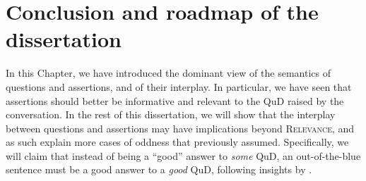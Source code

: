 %
%
%
%
%


\section{Conclusion and roadmap of the dissertation}

In this Chapter, we have introduced the dominant view of the semantics of questions and assertions, and of their interplay. In particular, we have seen that assertions should better be informative and relevant to the QuD raised by the conversation. In the rest of this dissertation, we will show that the interplay between questions and assertions may have implications beyond \textsc{Relevance}, and as such explain more cases of oddness that previously assumed. Specifically, we will claim that instead of being a ``good'' answer to \textit{some} QuD, an out-of-the-blue sentence must be a good answer to a \textit{good} QuD, following insights by \citet{Katzir2015}.

